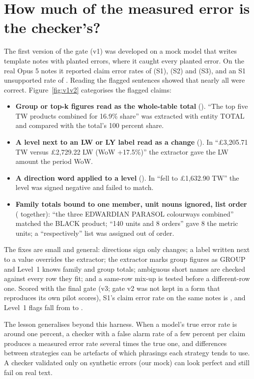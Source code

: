 \documentclass[11pt]{article}
\begin{document}
\section{How much of the measured error is the checker's?}
\label{sec:v1}

The first version of the gate (v1) was developed on a mock model that writes template notes with planted errors, where it caught every planted error. On the real Opus 5 notes it reported claim error rates of \VoneSoneClaim{} (S1), \VoneStwoClaim{} (S2) and \VoneSthreeClaim{} (S3), and an S1 unsupported rate of \VoneSoneUnsup{}. Reading the flagged sentences showed that nearly all were correct. Figure~\ref{fig:v1v2} categorises the \VoneFlags{} flagged claims:
\begin{itemize}
  \item \textbf{Group or top-k figures read as the whole-table total} (\CauseGroup{}). ``The top five TW products combined for 16.9\% share'' was extracted with entity TOTAL and compared with the total's 100 percent share.
  \item \textbf{A level next to an LW or LY label read as a change} (\CauseLevel{}). In ``\pounds3,205.71 TW versus \pounds2,729.22 LW (WoW +17.5\%)'' the extractor gave the LW amount the period WoW.
  \item \textbf{A direction word applied to a level} (\CauseDirection{}). In ``fell to \pounds1,632.90 TW'' the level was signed negative and failed to match.
  \item \textbf{Family totals bound to one member, unit nouns ignored, list order} (\CauseRest{} together): ``the three EDWARDIAN PARASOL colourways combined'' matched the BLACK product; ``140 units and 8 orders'' gave 8 the metric units; a ``respectively'' list was assigned out of order.
\end{itemize}
The fixes are small and general: directions sign only changes; a label written next to a value overrides the extractor; the extractor marks group figures as GROUP and Level~1 knows family and group totals; ambiguous short names are checked against every row they fit; and a same-row mix-up is tested before a different-row one. Scored with the final gate (v3; gate v2 was not kept in a form that reproduces its own pilot scores), S1's claim error rate on the same notes is \VtwoSoneClaim{}, and Level~1 flags fall from \VoneLoneFlags{} to \VtwoLoneFlags{}.

The lesson generalises beyond this harness. When a model's true error rate is around one percent, a checker with a false alarm rate of a few percent per claim produces a measured error rate several times the true one, and differences between strategies can be artefacts of which phrasings each strategy tends to use. A checker validated only on synthetic errors (our mock) can look perfect and still fail on real text.
\end{document}
